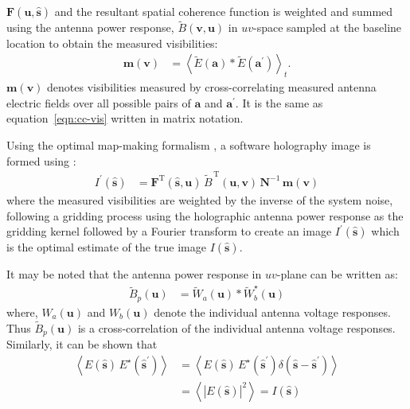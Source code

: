 \documentclass[a4paper,fleqn,usenatbib]{../mnras}
\begin{document}
$\mathbf{F}(\mathbf{u},\hat{\mathbf{s}})$ and the resultant spatial coherence
function is weighted and summed using the antenna power response,
$\widetilde{B}(\mathbf{v},\mathbf{u})$ in $uv$-space sampled at the baseline
location to obtain the measured visibilities:
\begin{align}
  \mathbf{m}(\mathbf{v}) &= \left\langle \widetilde{E}(\mathbf{a})\ast\widetilde{E}(\mathbf{a}^\prime)\right\rangle_t. \label{eqn:matrix-cc-vis}
\end{align}
$\mathbf{m}(\mathbf{v})$ denotes visibilities measured by cross-correlating
measured antenna electric fields over all possible pairs of $\mathbf{a}$ and
$\mathbf{a}^\prime$. It is the same as equation~\ref{eqn:cc-vis} written in
matrix notation.

Using the optimal map-making formalism \citep{teg97a,teg97b}, a software
holography image is formed using \citep{mor09}:
\begin{align}
  I^\prime(\hat{\mathbf{s}}) &= \mathbf{F}^\textrm{T}(\hat{\mathbf{s}},\mathbf{u})\,\widetilde{B}^{\,\textrm{T}}(\mathbf{u},\mathbf{v})\,\mathbf{N}^{-1}\,\mathbf{m}(\mathbf{v}) \label{eqn:dirty-image-FX}
\end{align}
where the measured visibilities are weighted by the inverse of the system noise,
following a gridding process using the holographic antenna power response as the
gridding kernel followed by a Fourier transform to create an image
$I^\prime(\hat{\mathbf{s}})$ which is the optimal estimate of the true image
$I(\hat{\mathbf{s}})$. 

It may be noted that the antenna power response in $uv$-plane can be written as:
\begin{align}\label{eqn:antenna-power-breakup}
  \tilde{B}_p(\mathbf{u}) &= \widetilde{W}_a(\mathbf{u}) \ast \widetilde{W}_b^\star(\mathbf{u})
\end{align}
where, $W_a(\mathbf{u})$ and $W_b(\mathbf{u})$ denote the individual antenna
voltage responses. Thus $\tilde{B}_p(\mathbf{u})$ is a cross-correlation of the
individual antenna voltage responses. Similarly, it can be shown that 
\begin{align}
  \left\langle E(\hat{\mathbf{s}})\,E^\star(\hat{\mathbf{s}}^\prime)\right\rangle &= \left\langle E(\hat{\mathbf{s}})\,E^\star(\hat{\mathbf{s}}^\prime) \delta(\hat{\mathbf{s}}-\hat{\mathbf{s}}^\prime) \right\rangle \nonumber\\
  &= \left\langle \left|E(\hat{\mathbf{s}})\right|^2 \right\rangle = I(\hat{\mathbf{s}}) \label{eqn:sky-intensity}
\end{align}
\end{document}
